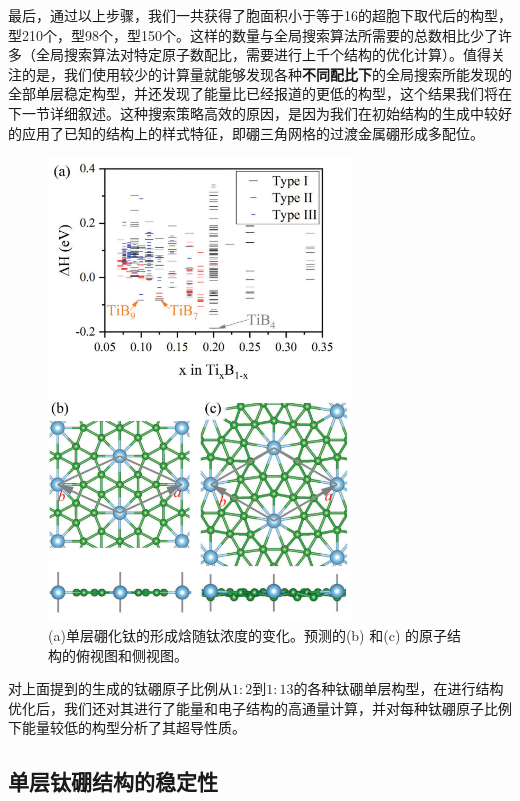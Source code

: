 最后，通过以上步骤，我们一共获得了胞面积小于等于16的超胞下取代后的构型，型\num{210}个，型\num{98}个，型\num{150}个。这样的数量与全局搜索算法所需要的总数相比少了许多（全局搜索算法对特定原子数配比，需要进行上千个结构的优化计算）。值得关注的是，我们使用较少的计算量就能够发现各种{\textbf{不同配比下}}的全局搜索所能发现的全部单层稳定构型，并还发现了能量比已经报道的更低的构型，这个结果我们将在下一节详细叙述。这种搜索策略高效的原因，是因为我们在初始结构的生成中较好的应用了已知的结构上的样式特征，即硼三角网格的过渡金属硼形成多配位。

\begin{figure}
  \includegraphics[width=0.72\textwidth]{figs/ch5_energy_hull.png}
  \centering
  \caption{(a)单层硼化钛的形成焓随钛浓度的变化。预测的(b) 和(c) 的原子结构的俯视图和侧视图。}
  \label{fig:ch5_energy_hull}
\end{figure}

对上面提到的生成的钛硼原子比例从$1:2$到$1:13$的各种钛硼单层构型，在进行结构优化后，我们还对其进行了能量和电子结构的高通量计算，并对每种钛硼原子比例下能量较低的构型分析了其超导性质。

\subsection{单层钛硼结构的稳定性}

